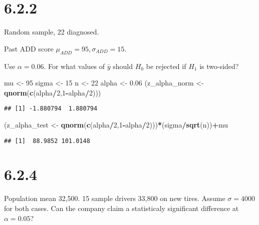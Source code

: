 \documentclass[]{article}
\newenvironment{Shaded}{\begin{snugshade}}{\end{snugshade}}
\newcommand{\KeywordTok}[1]{\textcolor[rgb]{0.13,0.29,0.53}{\textbf{#1}}}
\newcommand{\DecValTok}[1]{\textcolor[rgb]{0.00,0.00,0.81}{#1}}
\newcommand{\FloatTok}[1]{\textcolor[rgb]{0.00,0.00,0.81}{#1}}
\newcommand{\StringTok}[1]{\textcolor[rgb]{0.31,0.60,0.02}{#1}}
\newcommand{\OperatorTok}[1]{\textcolor[rgb]{0.81,0.36,0.00}{\textbf{#1}}}
\newcommand{\NormalTok}[1]{#1}
\begin{document}
\section{6.2.2}\label{section-1}

Random sample, 22 diagnosed.

Past ADD score \(\mu_{ADD} = 95, \sigma_{ADD} = 15\).

Use \(\alpha = 0.06\). For what values of \(\bar{y}\) should \(H_0\) be
rejected if \(H_1\) is two-sided?

\begin{Shaded}
\begin{Highlighting}[]
\NormalTok{mu <-}\StringTok{ }\DecValTok{95}
\NormalTok{sigma <-}\StringTok{ }\DecValTok{15}
\NormalTok{n <-}\StringTok{ }\DecValTok{22}
\NormalTok{alpha <-}\StringTok{ }\FloatTok{0.06}
\NormalTok{(z_alpha_norm <-}\StringTok{ }\KeywordTok{qnorm}\NormalTok{(}\KeywordTok{c}\NormalTok{(alpha}\OperatorTok{/}\DecValTok{2}\NormalTok{,}\DecValTok{1}\OperatorTok{-}\NormalTok{alpha}\OperatorTok{/}\DecValTok{2}\NormalTok{)))}
\end{Highlighting}
\end{Shaded}

\begin{verbatim}
## [1] -1.880794  1.880794
\end{verbatim}

\begin{Shaded}
\begin{Highlighting}[]
\NormalTok{(z_alpha_test <-}\StringTok{ }\KeywordTok{qnorm}\NormalTok{(}\KeywordTok{c}\NormalTok{(alpha}\OperatorTok{/}\DecValTok{2}\NormalTok{,}\DecValTok{1}\OperatorTok{-}\NormalTok{alpha}\OperatorTok{/}\DecValTok{2}\NormalTok{)))}\OperatorTok{*}\NormalTok{(sigma}\OperatorTok{/}\KeywordTok{sqrt}\NormalTok{(n))}\OperatorTok{+}\NormalTok{mu}
\end{Highlighting}
\end{Shaded}

\begin{verbatim}
## [1]  88.9852 101.0148
\end{verbatim}

\section{6.2.4}\label{section-2}

Population mean 32,500. 15 sample drivers 33,800 on new tires. Assume
\(\sigma=4000\) for both cases. Can the company claim a statisticaly
significant difference at \(\alpha=0.05\)?
\end{document}
